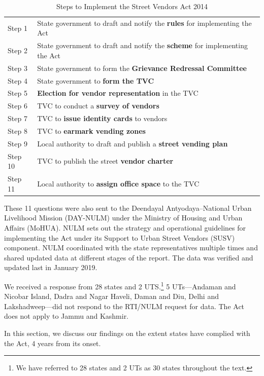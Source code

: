 \documentclass[a4paper, 12pt, twoside]{article}
\begin{document}
{%
\begin{table}[htpb]
\caption{Steps to Implement the Street Vendors Act 2014}
\label{tab: SVACsteps}
\begin{tabular}{ l  l } %
\toprule
Step 1	&	State government to draft and notify the \textbf{rules} for implementing the Act\\
Step 2 	&	State government to draft and notify the \textbf{scheme} for implementing the Act\\
Step 3	&	State government to form the \textbf{Grievance Redressal Committee}\\
Step 4	&	State government to \textbf{form the TVC}\\
Step 5	&	\textbf{Election for vendor representation} in the TVC\\
Step 6	&	TVC to conduct a \textbf{survey of vendors}\\
Step 7	&	TVC to \textbf{issue identity cards} to vendors\\
Step 8	&	TVC to \textbf{earmark vending zones}\\
Step 9 	&	Local authority to draft and publish a \textbf{street vending plan}\\
Step 10	&	TVC to publish the street \textbf{vendor charter}\\
Step 11	&	Local authority to \textbf{assign office space} to the TVC\\
\bottomrule
\end{tabular}
\end{table} 

These 11 questions were also sent to the Deendayal Antyodaya–National Urban Livelihood Mission (DAY-NULM) under the Ministry of Housing and Urban Affairs (MoHUA). NULM sets out the strategy and operational guidelines for implementing the Act under its Support to Urban Street Vendors (SUSV) component. NULM coordinated with the state representatives multiple times and shared updated data at different stages of the report. The data was verified and updated last in January 2019.

	We received a response from 28 states and 2 UTS.\footnote{We have referred to 28 states and 2 UTs as 30 states throughout the text.} 5 UTs—Andaman and Nicobar Island, Dadra and Nagar Haveli, Daman and Diu, Delhi and Lakshadweep—did not respond to the RTI/NULM request for data. The Act does not apply to Jammu and Kashmir. %

	In this section, we discuss our findings on the extent states have complied with the Act, 4 years from its onset.

}
\end{document}
